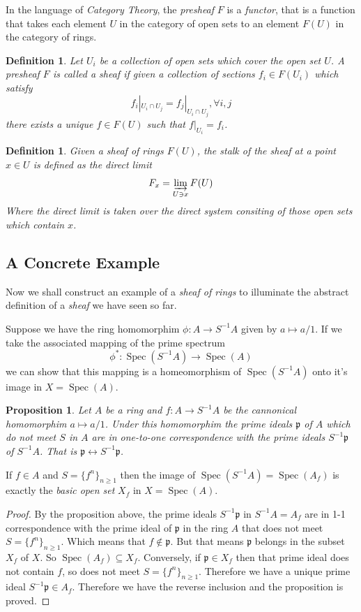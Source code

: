 \documentclass[]{report}
\newtheorem{prop}[theorem]{Proposition}
\newtheorem{defn}[theorem]{Definition}
\DeclareMathOperator\Spec{Spec}
\newcommand\byS{S^{-1}}
\begin{document}
In the language of \textit{Category Theory}, the \textit{presheaf} $F$ is a \textit{functor}, that is a function that takes each element $U$ in the category of open sets to an element $F(U)$ in the category of rings.

\begin{defn}
    Let  $U_i$ be a collection of open sets which cover the open set $U$. A presheaf $F$ is called a sheaf if given a collection of sections $f_i \in F(U_i)$ which satisfy  
    $$f_i |_{U_i \cap U_j} = f_j |_{U_i \cap U_j}, \forall i,j$$
   there exists a unique $f \in F(U)$ such that $f|_{U_i} = f_i$.
\end{defn}

\begin{defn}
    Given a sheaf of rings $F(U)$, the stalk of the sheaf at a point $x \in U$ is defined as the direct limit
    $$F_x = \varinjlim_{U \ni x} F(U)$$
    Where the direct limit is taken over the direct system consiting of those open sets which contain $x$. 
\end{defn}


\subsection{A Concrete Example}

Now we shall construct an example of a \textit{sheaf of rings} to illuminate the abstract definition of a \textit{sheaf} we have seen so far.

Suppose we have the ring homomorphim $\phi: A \rightarrow \byS A$ given by $a \mapsto a/1$. If we take the associated mapping of the prime spectrum
    $$\phi^* : \Spec(\byS A) \rightarrow \Spec(A)$$
    we can show that this mapping is a homeomorphism of $\Spec(\byS A)$ onto it's image in $X = \Spec(A)$. 

\begin{prop}
Let $A$ be a ring and $f: A \rightarrow \byS A$ be the cannonical homomorphim $a \mapsto a/1$. Under this homomorphim the prime ideals $\mathfrak{p}$ of $A$ which do not meet $S$ in $A$ are in one-to-one correspondence with the prime ideals $\byS \mathfrak{p}$ of $\byS A$. That is $\mathfrak{p} \leftrightarrow \byS \mathfrak{p}$.
\end{prop}


If $f \in A$ and $S = \{f^n\}_{n\geq1}$ then the image of $\Spec(\byS A) = \Spec(A_f)$ is exactly the \textit{basic open set} $X_f$ in $X = \Spec(A)$.

\begin{proof}
    By the proposition above, the prime ideals $\byS \mathfrak{p}$ in 
$\byS A = A_f$ are in 1-1 correspondence with the prime ideal of $\mathfrak{p}$ in the ring $A$ that does not meet $S = \{f^n\}_{n \geq 1}$. Which means that $f \not \in \mathfrak{p}$. But that means $\mathfrak{p}$ belongs in the subset $X_f$ of $X$. So $\Spec(A_f) \subseteq X_f$. Conversely, if $\mathfrak{p} \in X_f$ then that prime ideal does not contain $f$, so does not meet $S = \{f^n\}_{n \geq 1}$. Therefore we have a unique prime ideal $\byS \mathfrak{p} \in A_f$. Therefore we have the reverse inclusion and the proposition is proved.
\end{proof}
\end{document}
